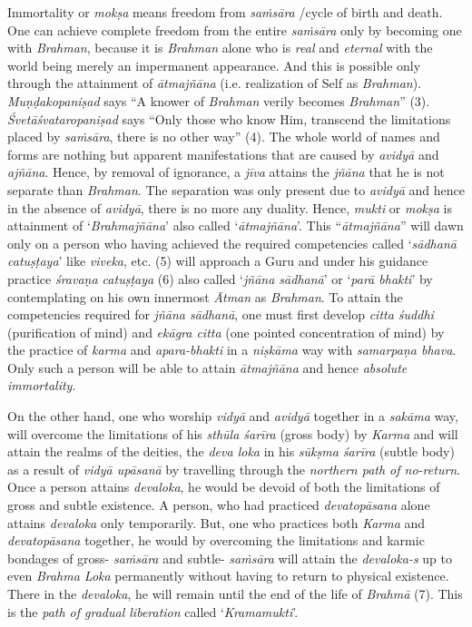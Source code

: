 Immortality or \emph{mokṣa} means freedom from \emph{saṁsāra} /cycle of birth and death. One can achieve complete freedom from the entire \emph{saṁsāra} only by becoming one with \emph{Brahman}, because it is \emph{Brahman} alone who is \emph{real} and \emph{eternal} with the world being merely an impermanent appearance. And this is possible only through the attainment of \emph{ātmajñāna} (i.e. realization of Self as \emph{Brahman}). \emph{Muṇḍakopaniṣad} says ``A knower of \emph{Brahman} verily becomes \emph{Brahman}'' (3). \emph{Śvetāśvataropaniṣad} says ``Only those who know Him, transcend the limitations placed by \emph{saṁsāra}, there is no other way'' (4). The whole world of names and forms are nothing but apparent manifestations that are caused by \emph{avidyā} and \emph{ajñāna}. Hence, by removal of ignorance, a \emph{jīva} attains the \emph{jñāna} that he is not separate than \emph{Brahman}. The separation was only present due to \emph{avidyā} and hence in the absence of \emph{avidyā}, there is no more any duality. Hence, \emph{mukti} or \emph{mokṣa} is attainment of `\emph{Brahmajñāna}' also called `\emph{ātmajñāna}'. This ``\emph{ātmajñāna}'' will dawn only on a person who having achieved the required competencies called `\emph{sādhanā catuṣṭaya}' like \emph{viveka}, etc. (5) will approach a Guru and under his guidance practice \emph{śravaṇa catuṣṭaya} (6) also called `\emph{jñāna sādhanā}' or `\emph{parā bhakti}' by contemplating on his own innermost \emph{Ātman} as \emph{Brahman}. To attain the competencies required for \emph{jñāna sādhanā}, one must first develop \emph{citta śuddhi} (purification of mind) and \emph{ekāgra citta} (one pointed concentration of mind) by the practice of \emph{karma} and \emph{apara-bhakti} in a \emph{niṣkāma} way with \emph{samarpaṇa bhava}. Only such a person will be able to attain \emph{ātmajñāna} and hence \emph{absolute immortality}.

On the other hand, one who worship \emph{vidyā} and \emph{avidyā} together in a \emph{sakāma} way, will overcome the limitations of his \emph{sthūla śarīra} (gross body) by \emph{Karma} and will attain the realms of the deities, the \emph{deva loka} in his \emph{sūkṣma śarīra} (subtle body) as a result of \emph{vidyā upāsanā} by travelling through the \emph{northern path of no-return}. Once a person attains \emph{devaloka}, he would be devoid of both the limitations of gross and subtle existence. A person, who had practiced \emph{devatopāsana} alone attains \emph{devaloka} only temporarily. But, one who practices both \emph{Karma} and \emph{devatopāsana} together, he would by overcoming the limitations and karmic bondages of gross- \emph{saṁsāra} and subtle- \emph{saṁsāra} will attain the \emph{devaloka-s} up to even \emph{Brahma Loka} permanently without having to return to physical existence. There in the \emph{devaloka}, he will remain until the end of the life of \emph{Brahmā} (7). This is the \emph{path of gradual liberation} called `\emph{Kramamukti}'.

